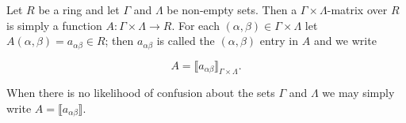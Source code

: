 Let $R$ be a ring and let $\Gamma$ and $\Lambda$ be non-empty sets. Then a $\Gamma \times \Lambda$-matrix over $R$ is simply a function $A: \Gamma \times \Lambda \rightarrow R$. For each $(\alpha, \beta) \in \Gamma \times \Lambda$ let $A(\alpha, \beta) = a_{\alpha\beta} \in R$; then $a_{\alpha\beta}$ is called the $(\alpha, \beta)$ entry in $A$ and we write

$$A = \llbracket a_{\alpha\beta} \rrbracket_{\Gamma \times \Lambda}.$$

When there is no likelihood of confusion about the sets $\Gamma$ and $\Lambda$ we may simply write $A = \llbracket a_{\alpha\beta} \rrbracket$.
